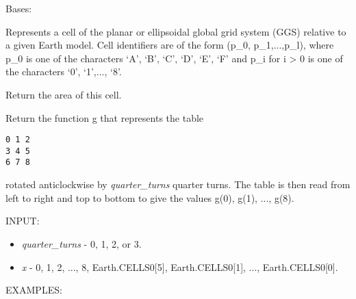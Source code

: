 \documentclass[a4paper,12ptopenany,oneside]{sphinxmanual}
\begin{document}
\begin{fulllineitems}
\label{grids:grids.Cell}
Bases: 

Represents a cell of the planar or ellipsoidal global grid system (GGS)
relative to a given Earth model.
Cell identifiers are of the form (p\_0, p\_1,...,p\_l), where p\_0 is one of 
the characters `A', `B', `C', `D', `E', `F' and p\_i for i \textgreater{} 0 is one of
the characters `0', `1',..., `8'.

\begin{fulllineitems}
\label{grids:grids.Cell.area}
Return the area of this cell.

\end{fulllineitems}


\begin{fulllineitems}
\label{grids:grids.Cell.atomic_rotate}
Return the function g that represents the table

\begin{Verbatim}[commandchars=\\\{\}]
0 1 2
3 4 5
6 7 8
\end{Verbatim}

rotated anticlockwise by \emph{quarter\_turns} quarter turns.
The table is then read from left to right and top to bottom
to give the values g(0), g(1), ..., g(8).

INPUT:
\begin{itemize}
\item {} 
\emph{quarter\_turns} - 0, 1, 2, or 3.

\item {} 
\emph{x} - 0, 1, 2, ..., 8, Earth.CELLS0{[}5{]}, Earth.CELLS0{[}1{]}, ..., Earth.CELLS0{[}0{]}.

\end{itemize}

EXAMPLES:


\end{fulllineitems}
\end{fulllineitems}
\end{document}

